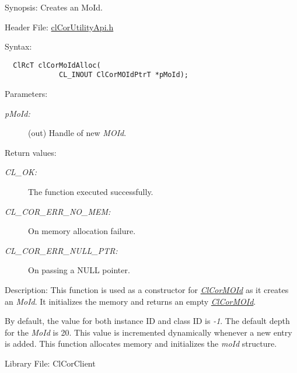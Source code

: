 \begin{Desc}
\item[Synopsis:]Creates an Mo\-Id.\end{Desc}
\begin{Desc}
\item[Header File:]\hyperlink{cl_cor_utility_api_8h}{cl\-Cor\-Utility\-Api.h}\end{Desc}
\begin{Desc}
\item[Syntax:]

\footnotesize\begin{verbatim}  ClRcT clCorMoIdAlloc(
             CL_INOUT ClCorMOIdPtrT *pMoId);
\end{verbatim}
\normalsize
\end{Desc}
\begin{Desc}
\item[Parameters:]
\begin{description}
\item[{\em p\-Mo\-Id:}](out) Handle of new {\em MOId\/}.\end{description}
\end{Desc}
\begin{Desc}
\item[Return values:]
\begin{description}
\item[{\em CL\_\-OK:}]The function executed successfully. \item[{\em CL\_\-COR\_\-ERR\_\-NO\_\-MEM:}]On memory allocation failure. \item[{\em CL\_\-COR\_\-ERR\_\-NULL\_\-PTR:}]On passing a NULL pointer.\end{description}
\end{Desc}
\begin{Desc}
\item[Description:]This function is used as a constructor for {\em \hyperlink{struct_cl_cor_m_o_id}{Cl\-Cor\-MOId}\/} as it creates an {\em Mo\-Id\/}. It initializes the memory and returns an empty {\em \hyperlink{struct_cl_cor_m_o_id}{Cl\-Cor\-MOId}\/}. \par
 \par
 By default, the value for both instance ID and class ID is {\em -1\/}. The default depth for the {\em Mo\-Id\/} is 20. This value is incremented dynamically whenever a new entry is added. This function allocates memory and initializes the {\em mo\-Id\/} structure.\end{Desc}
\begin{Desc}
\item[Library File:]Cl\-Cor\-Client\end{Desc}
